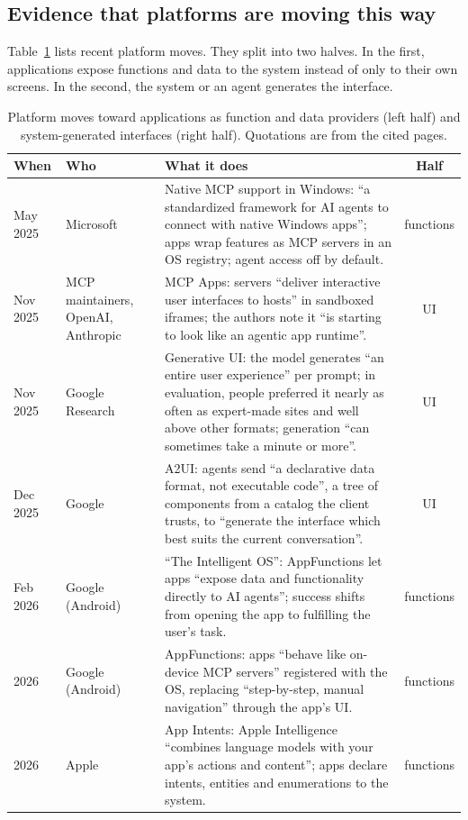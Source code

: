 \documentclass[10pt,twocolumn]{article}
\begin{document}
\subsection{Evidence that platforms are moving this way}

Table~\ref{tab:evidence} lists recent platform moves. They split into two halves. In the first,
applications expose functions and data to the system instead of only to their own screens. In the
second, the system or an agent generates the interface.

\begin{table}[t]
\centering\footnotesize
\begin{tabularx}{\textwidth}{@{}llXc@{}}
\toprule
When & Who & What it does & Half \\
\midrule
May 2025 & Microsoft~\cite{windowsmcp2025} & Native MCP support in Windows: ``a standardized framework for AI agents to connect with native Windows apps''; apps wrap features as MCP servers in an OS registry; agent access off by default. & functions \\
Nov 2025 & MCP maintainers, OpenAI, Anthropic~\cite{mcpapps2025,sep1865} & MCP Apps: servers ``deliver interactive user interfaces to hosts'' in sandboxed iframes; the authors note it ``is starting to look like an agentic app runtime''. & UI \\
Nov 2025 & Google Research~\cite{googlegenui2025} & Generative UI: the model generates ``an entire user experience'' per prompt; in evaluation, people preferred it nearly as often as expert-made sites and well above other formats; generation ``can sometimes take a minute or more''. & UI \\
Dec 2025 & Google~\cite{a2ui2025,newstack2025} & A2UI: agents send ``a declarative data format, not executable code'', a tree of components from a catalog the client trusts, to ``generate the interface which best suits the current conversation''. & UI \\
Feb 2026 & Google (Android)~\cite{intelligentos2026} & ``The Intelligent OS'': AppFunctions let apps ``expose data and functionality directly to AI agents''; success shifts from opening the app to fulfilling the user's task. & functions \\
2026 & Google (Android)~\cite{appfunctions} & AppFunctions: apps ``behave like on-device MCP servers'' registered with the OS, replacing ``step-by-step, manual navigation'' through the app's UI. & functions \\
2026 & Apple~\cite{appleintents} & App Intents: Apple Intelligence ``combines language models with your app's actions and content''; apps declare intents, entities and enumerations to the system. & functions \\
\bottomrule
\end{tabularx}
\caption{Platform moves toward applications as function and data providers (left half) and
system-generated interfaces (right half). Quotations are from the cited pages.}
\label{tab:evidence}
\end{table}
\end{document}
